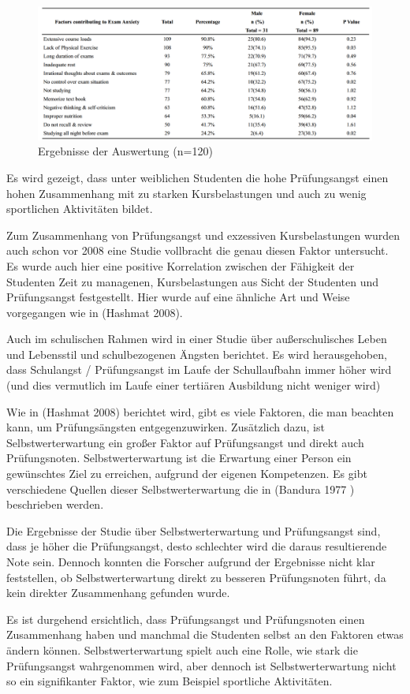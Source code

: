 \documentclass[11pt, a4paper]{article}
\begin{document}
	\begin{figure}[p]
		\centering
		\includegraphics[scale=0.5]{img/jpma_table.png}
		\caption{Ergebnisse der Auswertung (n=120) \cite{hashmat2008factors}}
		\label{fig:jpmatable}
	\end{figure}

	Es wird gezeigt, dass unter weiblichen Studenten die hohe Prüfungsangst einen hohen Zusammenhang mit zu starken Kursbelastungen und auch zu wenig sportlichen Aktivitäten bildet. \cite{hashmat2008factors}

	Zum Zusammenhang von Prüfungsangst und exzessiven Kursbelastungen wurden auch schon vor 2008 eine Studie vollbracht die genau diesen Faktor untersucht. Es wurde auch hier eine positive Korrelation zwischen der Fähigkeit der Studenten Zeit zu managenen,  Kursbelastungen aus Sicht der Studenten und Prüfungsangst festgestellt. Hier wurde auf eine ähnliche Art und Weise vorgegangen wie in (Hashmat 2008). \cite{sansgiry2006effect}

	Auch im schulischen Rahmen wird in einer Studie über außerschulisches Leben und Lebensstil und schulbezogenen Ängsten berichtet. Es wird herausgehoben, dass Schulangst / Prüfungsangst im Laufe der Schullaufbahn immer höher wird (und dies vermutlich im Laufe einer tertiären Ausbildung nicht weniger wird) \cite{pixner2013prufungsangst}

	Wie in (Hashmat 2008) berichtet wird, gibt es viele Faktoren, die man beachten kann, um Prüfungsängsten entgegenzuwirken. Zusätzlich dazu, ist Selbstwerterwartung ein großer Faktor auf Prüfungsangst und direkt auch Prüfungsnoten. Selbstwerterwartung ist die Erwartung einer Person ein gewünschtes Ziel zu erreichen, aufgrund der eigenen Kompetenzen. Es gibt verschiedene Quellen dieser Selbstwerterwartung die in (Bandura 1977 \cite{bandura1977self}) beschrieben werden.

	Die Ergebnisse der Studie über Selbstwerterwartung und Prüfungsangst sind, dass je höher die Prüfungsangst, desto schlechter wird die daraus resultierende Note sein. Dennoch konnten die Forscher aufgrund der Ergebnisse nicht klar feststellen, ob Selbstwerterwartung direkt zu besseren Prüfungsnoten führt, da kein direkter Zusammenhang gefunden wurde. \cite{barrows2013anxiety}

	Es ist durgehend ersichtlich, dass Prüfungsangst und Prüfungsnoten einen Zusammenhang haben und manchmal die Studenten selbst an den Faktoren etwas ändern können. Selbstwerterwartung spielt auch eine Rolle, wie stark die Prüfungsangst wahrgenommen wird, aber dennoch ist Selbstwerterwartung nicht so ein signifikanter Faktor, wie zum Beispiel sportliche Aktivitäten. \cite{barrows2013anxiety} \cite{hashmat2008factors}
\newpage

{}

\end{document}

